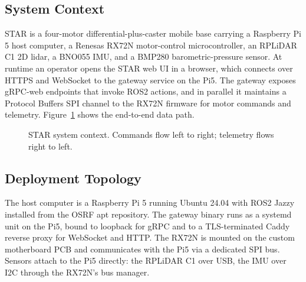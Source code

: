 \documentclass[11pt,letterpaper]{article}
\begin{document}
\subsection{System Context}
STAR is a four-motor differential-plus-caster mobile base carrying a
Raspberry Pi 5 host computer, a Renesas RX72N motor-control
microcontroller, an RPLiDAR C1 2D lidar, a BNO055 IMU, and a BMP280
barometric-pressure sensor. At runtime an operator opens the STAR web
UI in a browser, which connects over HTTPS and WebSocket to the
gateway service on the Pi5. The gateway exposes gRPC-web endpoints
that invoke ROS2 actions, and in parallel it maintains a Protocol
Buffers SPI channel to the RX72N firmware for motor commands and
telemetry. Figure~\ref{fig:system-context} shows the end-to-end data
path.

\begin{figure}[H]
\centering
{}
\caption{STAR system context. Commands flow left to right; telemetry
flows right to left.}
\label{fig:system-context}
\end{figure}

\subsection{Deployment Topology}
The host computer is a Raspberry Pi 5 running Ubuntu 24.04 with ROS2
Jazzy installed from the OSRF apt repository. The gateway binary runs
as a systemd unit on the Pi5, bound to loopback for gRPC and to a
TLS-terminated Caddy reverse proxy for WebSocket and HTTP. The RX72N
is mounted on the custom motherboard PCB and communicates with the Pi5
via a dedicated SPI bus. Sensors attach to the Pi5 directly: the
RPLiDAR C1 over USB, the IMU over I2C through the RX72N's bus manager.
\end{document}
